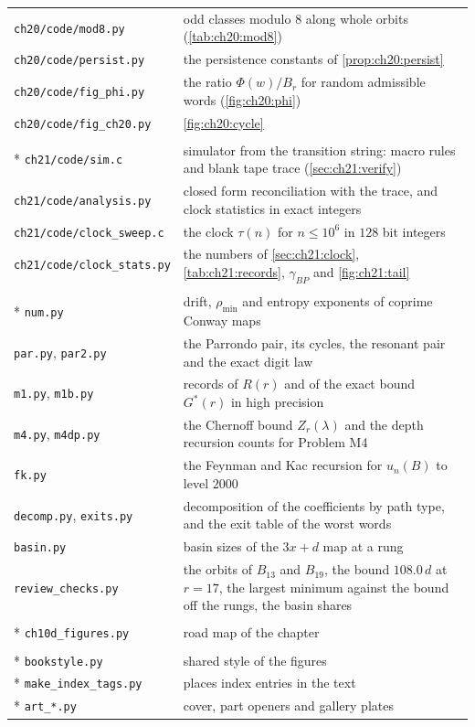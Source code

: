 {\begin{longtable}{@{}l>{\raggedright\arraybackslash}p{}@{}}
\texttt{ch20/code/mod8.py} & odd classes modulo $8$ along whole orbits (\cref{tab:ch20:mod8}) \\
\texttt{ch20/code/persist.py} & the persistence constants of \cref{prop:ch20:persist} \\
\texttt{ch20/code/fig\_phi.py} & the ratio $\Phi(w)/B_r$ for random admissible words (\cref{fig:ch20:phi}) \\
\texttt{ch20/code/fig\_ch20.py} & \cref{fig:ch20:cycle} \\
\addlinespace[4pt]
\multicolumn{2}{@{}l}{\itshape\Cref{chap:quantifier}} \\*
\texttt{ch21/code/sim.c} & simulator from the transition string: macro rules and blank tape trace (\cref{sec:ch21:verify}) \\
\texttt{ch21/code/analysis.py} & closed form reconciliation with the trace, and clock statistics in exact integers \\
\texttt{ch21/code/clock\_sweep.c} & the clock $\tau(n)$ for $n\le10^6$ in $128$ bit integers \\
\texttt{ch21/code/clock\_stats.py} & the numbers of \cref{sec:ch21:clock}, \cref{tab:ch21:records}, $\gamma_{BP}$ and \cref{fig:ch21:tail} \\
\addlinespace[4pt]
\multicolumn{2}{@{}l}{\itshape\Cref{rrt:chap:ratchets}, in \texttt{ch20r/code}} \\*
\texttt{num.py} & drift, $\rho_{\min}$ and entropy exponents of coprime Conway maps \\
\texttt{par.py}, \texttt{par2.py} & the Parrondo pair, its cycles, the resonant pair and the exact digit law \\
\texttt{m1.py}, \texttt{m1b.py} & records of $R(r)$ and of the exact bound $G^*(r)$ in high precision \\
\texttt{m4.py}, \texttt{m4dp.py} & the Chernoff bound $Z_r(\lambda)$ and the depth recursion counts for Problem M4 \\
\texttt{fk.py} & the Feynman and Kac recursion for $u_n(B)$ to level $2000$ \\
\texttt{decomp.py}, \texttt{exits.py} & decomposition of the coefficients by path type, and the exit table of the worst words \\
\texttt{basin.py} & basin sizes of the $3x+d$ map at a rung \\
\texttt{review\_checks.py} & the orbits of $B_{13}$ and $B_{19}$, the bound $108.0\,d$ at $r=17$, the largest minimum against the bound off the rungs, the basin shares \\
\addlinespace[4pt]
\multicolumn{2}{@{}l}{\itshape\Cref{chap:synthesis}} \\*
\texttt{ch10d\_figures.py} & road map of the chapter \\
\addlinespace[4pt]
\multicolumn{2}{@{}l}{\itshape Utilities and the gallery} \\*
\texttt{bookstyle.py} & shared style of the figures \\*
\texttt{make\_index\_tags.py} & places index entries in the text \\*
\texttt{art\_*.py} & cover, part openers and gallery plates \\
\end{longtable}}
